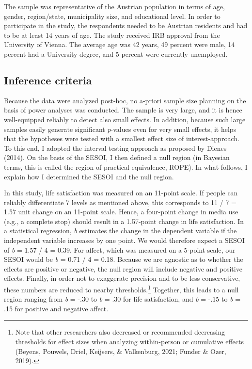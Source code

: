 \documentclass[
  english,
  man,mask,floatsintext]{apa6}
\begin{document}
The sample was representative of the Austrian population in terms of age, gender, region/state, municipality size, and educational level.
In order to participate in the study, the respondents needed to be Austrian residents and had to be at least 14 years of age.
The study received IRB approval from the University of Vienna.
The average age was 42 years, 49 percent were male, 14 percent had a University degree, and 5 percent were currently unemployed.

\hypertarget{inference-criteria}{%
\subsection{Inference criteria}\label{inference-criteria}}

Because the data were analyzed post-hoc, no a-priori sample size planning on the basis of power analyses was conducted.
The sample is very large, and it is hence well-equipped reliably to detect also small effects.
In addition, because such large samples easily generate significant \emph{p}-values even for very small effects, it helps that the hypotheses were tested with a smallest effect size of interest-approach.
To this end, I adopted the interval testing approach as proposed by Dienes (2014).
On the basis of the SESOI, I then defined a null region (in Bayesian terms, this is called the region of practical equivalence, ROPE).
In what follows, I explain how I determined the SESOI and the null region.

In this study, life satisfaction was measured on an 11-point scale.
If people can reliably differentiate 7 levels as mentioned above, this corresponds to 11 / 7 = 1.57 unit change on an 11-point scale.
Hence, a four-point change in media use (e.g., a complete stop) should result in a 1.57-point change in life satisfaction.
In a statistical regression, \emph{b} estimates the change in the dependent variable if the independent variable increases by one point.
We would therefore expect a SESOI of \emph{b} = 1.57 / 4 = 0.39.
For affect, which was measured on a 5-point scale, our SESOI would be \emph{b} = 0.71 / 4 = 0.18.
Because we are agnostic as to whether the effects are positive or negative, the null region will include negative and positive effects.
Finally, in order not to exaggerate precision and to be less conservative, these numbers are reduced to nearby thresholds.\footnote{Note that other researchers also decreased or recommended decreasing thresholds for effect sizes when analyzing within-person or cumulative effects (Beyens, Pouwels, Driel, Keijsers, \& Valkenburg, 2021; Funder \& Ozer, 2019).}
Together, this leads to a null region ranging from \emph{b} = -.30 to \emph{b} = .30 for life satisfaction, and \emph{b} = -.15 to \emph{b} = .15 for positive and negative affect.
\end{document}
